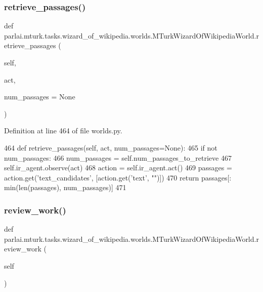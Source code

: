 \subsubsection{\texorpdfstring{retrieve\+\_\+passages()}{retrieve\_passages()}}
{\footnotesize\ttfamily def parlai.\+mturk.\+tasks.\+wizard\+\_\+of\+\_\+wikipedia.\+worlds.\+M\+Turk\+Wizard\+Of\+Wikipedia\+World.\+retrieve\+\_\+passages (\begin{DoxyParamCaption}\item[{}]{self,  }\item[{}]{act,  }\item[{}]{num\+\_\+passages = {\ttfamily None} }\end{DoxyParamCaption})}



Definition at line 464 of file worlds.\+py.


\begin{DoxyCode}
464     \textcolor{keyword}{def }retrieve\_passages(self, act, num\_passages=None):
465         \textcolor{keywordflow}{if} \textcolor{keywordflow}{not} num\_passages:
466             num\_passages = self.num\_passages\_to\_retrieve
467         self.ir\_agent.observe(act)
468         action = self.ir\_agent.act()
469         passages = action.get(\textcolor{stringliteral}{'text\_candidates'}, [action.get(\textcolor{stringliteral}{'text'}, \textcolor{stringliteral}{""})])
470         \textcolor{keywordflow}{return} passages[: min(len(passages), num\_passages)]
471 
\end{DoxyCode}
\mbox{\label{classparlai_1_1mturk_1_1tasks_1_1wizard__of__wikipedia_1_1worlds_1_1MTurkWizardOfWikipediaWorld_adf9ddc1cbe8f2abc7f42995d621904bf}} 
\subsubsection{\texorpdfstring{review\+\_\+work()}{review\_work()}}
{\footnotesize\ttfamily def parlai.\+mturk.\+tasks.\+wizard\+\_\+of\+\_\+wikipedia.\+worlds.\+M\+Turk\+Wizard\+Of\+Wikipedia\+World.\+review\+\_\+work (\begin{DoxyParamCaption}\item[{}]{self }\end{DoxyParamCaption})}



